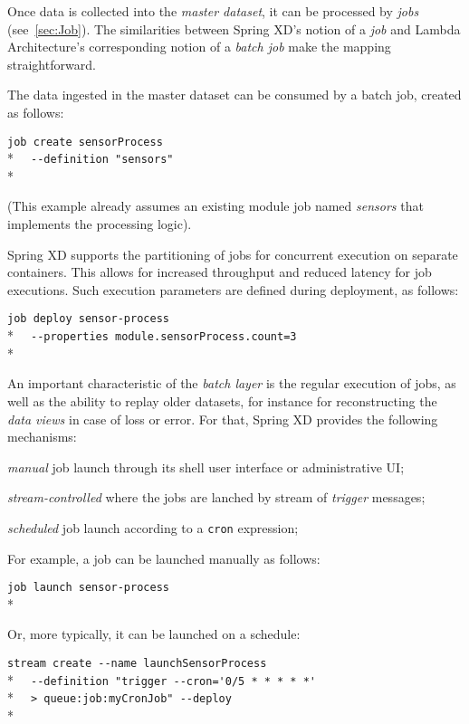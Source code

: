Once data is collected into the \emph{master dataset}, it can be processed
by \emph{jobs} (see~\ref{sec:Job}). The similarities between Spring XD's
notion of a \emph{job} and Lambda Architecture's corresponding notion of
a \emph{batch job} make the mapping straightforward.


The data ingested in the master dataset can be consumed by a batch job,
created as follows:

\verb;job create sensorProcess;\\*
\verb;  --definition "sensors";\\*

(This example already assumes an existing module job named \emph{sensors} that
implements the processing logic).

Spring XD supports the partitioning of jobs for concurrent execution on
separate containers. This allows for increased throughput and reduced latency
for job executions. Such execution parameters are defined during deployment,
as follows:

\verb;job deploy sensor-process;\\*
\verb;  --properties module.sensorProcess.count=3;\\*

An important characteristic of the \emph{batch layer} is the regular
execution of jobs, as well as the ability to replay older datasets, for
instance for reconstructing the \emph{data views} in case of loss or error.
For that, Spring XD provides the following mechanisms:

\begin{itemize*}
\item \emph{manual} job launch through its shell user interface or 
administrative UI;
\item \emph{stream-controlled} where the jobs are lanched by stream of 
\emph{trigger} messages;
\item \emph{scheduled} job launch according to a \texttt{cron} expression;
\end{itemize*}

For example, a job can be launched manually as follows:

\verb;job launch sensor-process;\\*

Or, more typically, it can be launched on a schedule:

\verb;stream create --name launchSensorProcess;\\*
\verb;  --definition "trigger --cron='0/5 * * * * *';\\* 
\verb;  > queue:job:myCronJob" --deploy;\\*

